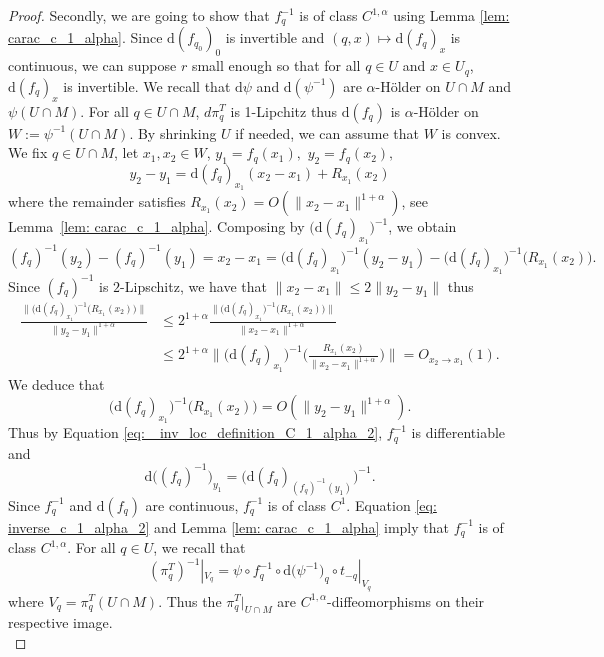 \documentclass[11pt,reqno,a4paper]{article}%
\theoremstyle{definition}
\theoremstyle{remark}
\renewcommand{\leq}{\leqslant}
\renewcommand{\d}{\mathrm{d}}
\renewcommand{\d}{\mathrm{d}}
\begin{document}
\begin{proof}
    \noindent Secondly, we are going to show that $f_q^{-1}$ is of class $C^{1,\alpha}$ using Lemma \ref{lem: carac_c_1_alpha}.
    Since $\d (f_{q_0})_0$ is invertible and $(q,x) \mapsto \d (f_q)_x$ is continuous, we can suppose $r$ small enough so that for all $q \in U$ and $x \in U_q$, $\d (f_q)_x$ is invertible.
    We recall that  $\d \psi$ and $\d (\psi^{-1})$ are $\alpha$-Hölder on $U \cap M$ and $\psi(U \cap M)$.
    For all $q \in U \cap M$, $d \pi_q^T$ is 1-Lipchitz thus $\d (f_{q})$ is $\alpha$-Hölder on $W :=\psi^{-1}(U \cap M)$.
    By shrinking $U$ if needed, we can assume that $W$ is convex. 
    We fix $q \in U\cap M$, let $x_1,x_2\in W$, $y_1=f_q(x_1),$ $y_2=f_q(x_2),$ 
    $$ y_2 - y_1 = \d (f_q)_{x_1}(x_2-x_1) + R_{x_1}(x_2)$$
    where the remainder satisfies $R_{x_1}(x_2) = O(\|x_2-x_1\|^{1+\alpha})$, see Lemma~\ref{lem: carac_c_1_alpha}. 
    Composing by $\big(\d (f_q)_{x_1}\big)^{-1}$, we obtain
    \begin{equation} \label{eq: _inv_loc_definition_C_1_alpha_2}
        (f_q)^{-1}(y_2) -  (f_q)^{-1}(y_1) = x_2-x_1 = \big(\d (f_q)_{x_1}\big)^{-1}(y_2 - y_1) - \big(\d (f_q)_{x_1}\big)^{-1}\big(R_{x_1}(x_2)\big).
    \end{equation}
    Since $(f_q)^{-1}$ is $2$-Lipschitz, we have that $\|x_2-x_1\| \leq 2 \|y_2-y_1\|$ thus
    \begin{align*}
        \frac{\| \big(\d (f_q)_{x_1}\big)^{-1}\big(R_{x_1}(x_2)\big) \|}{\|y_2-y_1\|^{1+\alpha}} &\leq 2^{1+\alpha} \frac{\| \big(\d (f_q)_{x_1}\big)^{-1}\big(R_{x_1}(x_2)\big) \|}{\|x_2-x_1\|^{1+\alpha}} \\ 
        &\leq 2^{1+\alpha} \bigg\| \big(\d (f_q)_{x_1}\big)^{-1}\bigg( \frac{R_{x_1}(x_2)}{\|x_2-x_1\|^{1+\alpha}} \bigg) \bigg\| = O_{x_2\to x_1}(1).
    \end{align*}
    We deduce that 
    \begin{equation} \label{eq: inverse_c_1_alpha_2}
        \big(\d (f_q)_{x_1}\big)^{-1}\big(R_{x_1}(x_2)\big) = O(\|y_2-y_1\|^{1+\alpha}).
    \end{equation}
    Thus by Equation \eqref{eq: _inv_loc_definition_C_1_alpha_2}, $f_q^{-1}$ is differentiable and 
    $$\d \big( (f_q)^{-1} \big)_{y_1} = \big(\d (f_q)_{(f_q)^{-1}(y_1)} \big)^{-1}.$$
    Since $f_q^{-1}$ and $\d (f_q)$ are continuous, $f_q^{-1}$ is of class $C^1$. Equation \eqref{eq: inverse_c_1_alpha_2} and Lemma \ref{lem: carac_c_1_alpha} imply that  $f_q^{-1}$ is of class $C^{1,\alpha}$.
    For all $q \in U$, we recall that
    $$(\pi_{q}^T)^{-1} |_{V_q} = \psi \circ f_{q}^{-1} \circ \d \big(\psi^{-1}\big) _q \circ t_{-q} |_{V_q} $$
    where $V_q = \pi_{q}^T (U \cap M)$.
    Thus the $\pi_{q}^T |_{U \cap M}$ are $C^{1,\alpha}$-diffeomorphisms on their respective image.\\
    

\end{proof}
\end{document}
